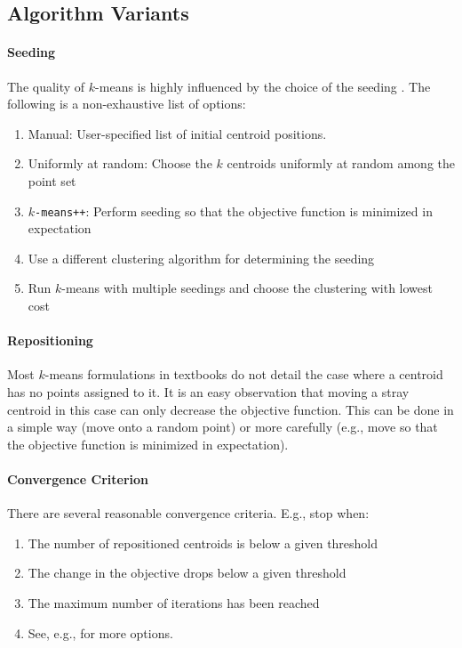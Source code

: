 \subsection{Algorithm Variants}

\paragraph{Seeding}

The quality of $k$-means is highly influenced by the choice of the seeding \cite{AV07a}. The following is a non-exhaustive list of options:
\begin{enumerate}
	\item Manual: User-specified list of initial centroid positions.
	\item Uniformly at random: Choose the $k$ centroids uniformly at random among the point set
	\item \texttt{$k$-means++}: Perform seeding so that the objective function is minimized in expectation \cite{AV07a}
	\item Use a different clustering algorithm for determining the seeding \cite{MNU00a}
	\item Run $k$-means with multiple seedings and choose the clustering with lowest cost
\end{enumerate}

\paragraph{Repositioning}

Most $k$-means formulations in textbooks do not detail the case where a centroid has no points assigned to it. It is an easy observation that moving a stray centroid in this case can only decrease the objective function. This can be done in a simple way (move onto a random point) or more carefully (e.g., move so that the objective function is minimized in expectation).

\paragraph{Convergence Criterion}

There are several reasonable convergence criteria. E.g., stop when:
\begin{enumerate}
	\item The number of repositioned centroids is below a given threshold
	\item The change in the objective drops below a given threshold
	\item The maximum number of iterations has been reached
	\item See, e.g., \textcite[Section~16.4]{CS08a} for more options.
\end{enumerate}

